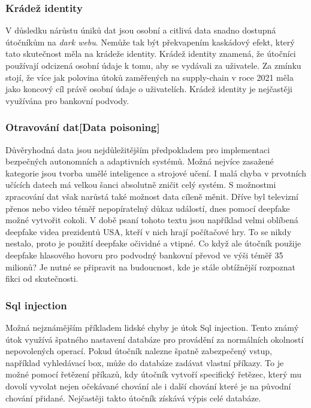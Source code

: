 \subsubsection{Krádež identity}
V důsledku nárůstu úniků dat jsou osobní a citlivá data snadno dostupná útočníkům na \textit{dark webu}.
Nemůže tak být překvapením kaskádový efekt, který tato skutečnost měla na krádeže identity.
Krádež identity znamená, že útočníci používají odcizená osobní údaje k tomu, aby se vydávali za uživatele.
Za zmínku stojí, že více jak polovina útoků zaměřených na supply-chain v roce 2021 měla jako koncový cíl právě osobní údaje o uživatelích.
Krádež identity je nejčastěji využívána pro bankovní podvody.\cite{Enisa_thread_landscape}

\subsubsection{Otravování dat[Data poisoning]}
Důvěryhodná data jsou nejdůležitějším předpokladem pro implementaci bezpečných autonomních a adaptivních systémů.
Možná nejvíce zasažené kategorie jsou tvorba umělé inteligence a strojové učení.
I malá chyba v prvotních učících datech má velkou šanci absolutně zničit celý systém.
S možnostmi zpracování dat však narůstá také možnost data cíleně měnit.
Dříve byl televizní přenos nebo video téměř nepopíratelný důkaz událostí, dnes pomocí deepfake možné vytvořit cokoli.
V době psaní tohoto textu jsou například velmi oblíbená deepfake videa prezidentů USA, kteří v nich hrají počítačové hry.
To se nikdy nestalo, proto je použití deepfake očividné a vtipné.
Co když ale útočník použije deepfake hlasového hovoru pro podvodný bankovní převod ve výši téměř 35 milionů?
Je nutné se připravit na budoucnost, kde je stále obtížnější rozpoznat fikci od skutečnosti.\cite{Enisa_thread_landscape}

\subsubsection{Sql injection}
Možná nejznámějším příkladem lidské chyby je útok Sql injection.
Tento známý útok využívá špatného nastavení databáze pro provádění za normálních okolností nepovolených operací.
Pokud útočník nalezne špatně zabezpečený vstup, například vyhledávací box, může do databáze zadávat vlastní příkazy.
To je možné pomocí řetězení příkazů, kdy útočník vytvoří specifický řetězec, který mu dovolí vyvolat nejen očekávané chování ale i další chování které je na původní chování přidané.
Nejčastěji takto útočník získává výpis celé databáze.\cite{cisco_most_common_attack}


